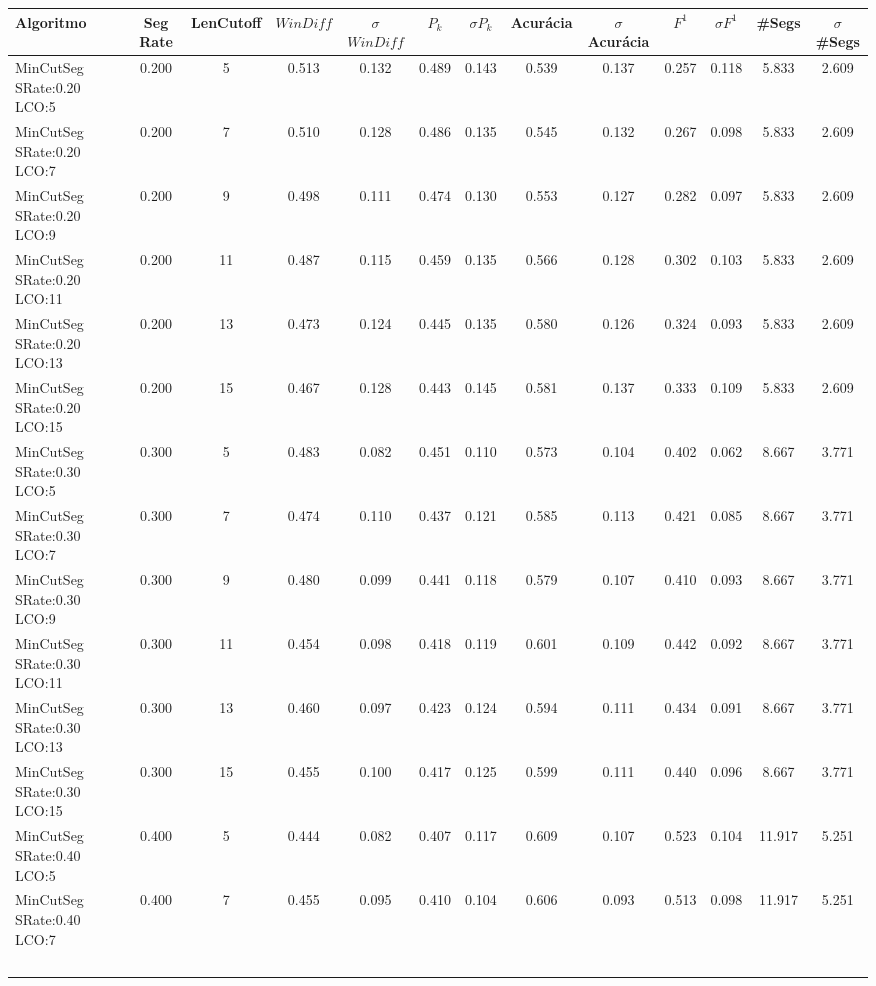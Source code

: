 \documentclass{article}
\begin{document}
\tiny\begin{longtable}[c]{|l|c|c|c|c|c|c|c|c|c|c|c|c|} 
\hline 
Algoritmo & Seg Rate & LenCutoff & $WinDiff$ & $\sigma$$WinDiff$ & $P_k$ & $\sigma$$P_k$ & Acurácia & $\sigma$Acurácia & $F^1$ & $\sigma$$F^1$ & \#Segs & $\sigma$\#Segs\\ \hline 
MinCutSeg SRate:0.20 LCO:5 & 0.200 & 5 & 0.513 & 0.132 & 0.489 & 0.143 & 0.539 & 0.137 & 0.257 & 0.118 & 5.833 & 2.609  \\ \hline 
 MinCutSeg SRate:0.20 LCO:7 & 0.200 & 7 & 0.510 & 0.128 & 0.486 & 0.135 & 0.545 & 0.132 & 0.267 & 0.098 & 5.833 & 2.609  \\ \hline 
 MinCutSeg SRate:0.20 LCO:9 & 0.200 & 9 & 0.498 & 0.111 & 0.474 & 0.130 & 0.553 & 0.127 & 0.282 & 0.097 & 5.833 & 2.609  \\ \hline 
 MinCutSeg SRate:0.20 LCO:11 & 0.200 & 11 & 0.487 & 0.115 & 0.459 & 0.135 & 0.566 & 0.128 & 0.302 & 0.103 & 5.833 & 2.609  \\ \hline 
 MinCutSeg SRate:0.20 LCO:13 & 0.200 & 13 & 0.473 & 0.124 & 0.445 & 0.135 & 0.580 & 0.126 & 0.324 & 0.093 & 5.833 & 2.609  \\ \hline 
 MinCutSeg SRate:0.20 LCO:15 & 0.200 & 15 & 0.467 & 0.128 & 0.443 & 0.145 & 0.581 & 0.137 & 0.333 & 0.109 & 5.833 & 2.609  \\ \hline 
 MinCutSeg SRate:0.30 LCO:5 & 0.300 & 5 & 0.483 & 0.082 & 0.451 & 0.110 & 0.573 & 0.104 & 0.402 & 0.062 & 8.667 & 3.771  \\ \hline 
 MinCutSeg SRate:0.30 LCO:7 & 0.300 & 7 & 0.474 & 0.110 & 0.437 & 0.121 & 0.585 & 0.113 & 0.421 & 0.085 & 8.667 & 3.771  \\ \hline 
 MinCutSeg SRate:0.30 LCO:9 & 0.300 & 9 & 0.480 & 0.099 & 0.441 & 0.118 & 0.579 & 0.107 & 0.410 & 0.093 & 8.667 & 3.771  \\ \hline 
 MinCutSeg SRate:0.30 LCO:11 & 0.300 & 11 & 0.454 & 0.098 & 0.418 & 0.119 & 0.601 & 0.109 & 0.442 & 0.092 & 8.667 & 3.771  \\ \hline 
 MinCutSeg SRate:0.30 LCO:13 & 0.300 & 13 & 0.460 & 0.097 & 0.423 & 0.124 & 0.594 & 0.111 & 0.434 & 0.091 & 8.667 & 3.771  \\ \hline 
 MinCutSeg SRate:0.30 LCO:15 & 0.300 & 15 & 0.455 & 0.100 & 0.417 & 0.125 & 0.599 & 0.111 & 0.440 & 0.096 & 8.667 & 3.771  \\ \hline 
 MinCutSeg SRate:0.40 LCO:5 & 0.400 & 5 & 0.444 & 0.082 & 0.407 & 0.117 & 0.609 & 0.107 & 0.523 & 0.104 & 11.917 & 5.251  \\ \hline 
 MinCutSeg SRate:0.40 LCO:7 & 0.400 & 7 & 0.455 & 0.095 & 0.410 & 0.104 & 0.606 & 0.093 & 0.513 & 0.098 & 11.917 & 5.251  \\ \hline 
$$
\end{longtable}
\end{document}
